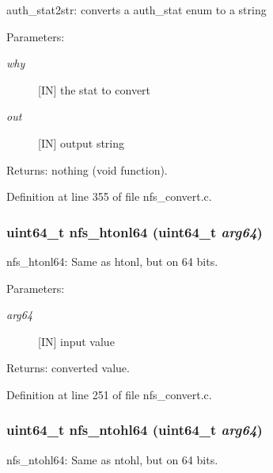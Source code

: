auth\_\-stat2str: converts a auth\_\-stat enum to a string

\begin{Desc}
\item[Parameters:]
\begin{description}
\item[{\em why}][IN] the stat to convert \item[{\em out}][IN] output string\end{description}
\end{Desc}
\begin{Desc}
\item[Returns:]nothing (void function). \end{Desc}


Definition at line 355 of file nfs\_\-convert.c.
\subsubsection[{nfs\_\-htonl64}]{\setlength{\rightskip}{0pt plus 5cm}uint64\_\-t nfs\_\-htonl64 (uint64\_\-t {\em arg64})}\label{nfs__convert_8c_b52fdbc875109ccb84900a657877a23b}


nfs\_\-htonl64: Same as htonl, but on 64 bits.

\begin{Desc}
\item[Parameters:]
\begin{description}
\item[{\em arg64}][IN] input value\end{description}
\end{Desc}
\begin{Desc}
\item[Returns:]converted value. \end{Desc}


Definition at line 251 of file nfs\_\-convert.c.
\subsubsection[{nfs\_\-ntohl64}]{\setlength{\rightskip}{0pt plus 5cm}uint64\_\-t nfs\_\-ntohl64 (uint64\_\-t {\em arg64})}\label{nfs__convert_8c_87865063f614e91e712203f47c423cb6}


nfs\_\-ntohl64: Same as ntohl, but on 64 bits.

